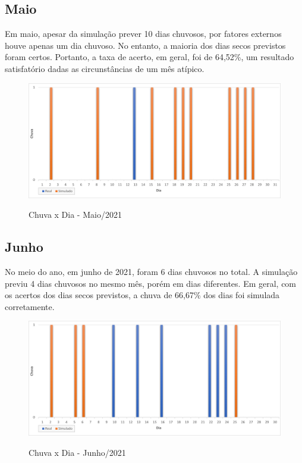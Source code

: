 \subsection{Maio}
Em maio, apesar da simulação prever 10 dias chuvosos, por fatores externos houve apenas um dia chuvoso. No entanto, a maioria dos dias secos previstos foram certos. Portanto, a taxa de acerto, em geral, foi de 64,52\%, um resultado satisfatório dadas as circunstâncias de um mês atípico.
\begin{figure}[H]
	\caption{\small Chuva x Dia - Maio/2021}
	\centering
	\includegraphics[width=\textwidth]{figs/mai.png}
	\label{f.rmai}
\end{figure}

\subsection{Junho}
No meio do ano, em junho de 2021, foram 6 dias chuvosos no total. A simulação previu 4 dias chuvosos no mesmo mês, porém em dias diferentes. Em geral, com os acertos dos dias secos previstos, a chuva de 66,67\% dos dias foi simulada corretamente.
\begin{figure}[H]
	\caption{\small Chuva x Dia - Junho/2021}
	\centering
	\includegraphics[width=\textwidth]{figs/jun.png}
	\label{f.rjun}
\end{figure}

